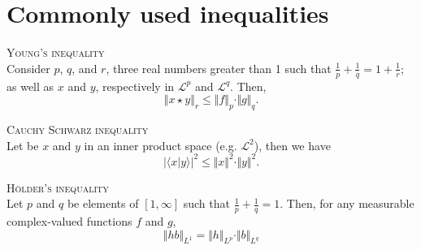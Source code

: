 \section{Commonly used inequalities}

\begin{lm}{\textsc{Young's inequality} \\}\label{A.3.1}
Consider $p$, $q$, and $r$, three real numbers greater than 1 such that $\frac{1}{p} + \frac{1}{q} = 1 + \frac{1}{r}$; as well as $x$ and $y$, respectively in $\mathcal{L}^{p}$ and $\mathcal{L}^{q}$.
Then,
\[\left\Vert x \star y\right\Vert_{r} \leq \Vert f \Vert_{p} \cdot \Vert g \Vert_{q}.\]
\end{lm}

\begin{lm}{\textsc{Cauchy Schwarz inequality} \\}\label{A.3.2}
Let be $x$ and $y$ in an inner product space (e.g. $\mathcal{L}^{2}$), then we have
\[\vert \langle x \vert y \rangle \vert^{2} \leq \Vert x \Vert^{2} \cdot \Vert y \Vert^{2}.\]
\end{lm}

\begin{lm}{\textsc{Hölder's inequality} \\}\label{A.3.3}
Let $p$ and $q$ be elements of $[1, \infty]$ such that $\frac{1}{p} + \frac{1}{q} = 1$. Then, for any measurable complex-valued functions $f$ and $g$,
\[\Vert h b \Vert_{L^{1}} = \Vert h \Vert_{L^{p}} \cdot \Vert b \Vert_{L^{q}}\]
\end{lm}
